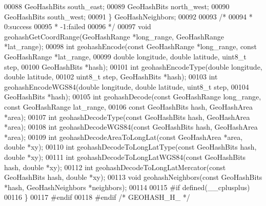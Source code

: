 \begin{DoxyCode}
00088     GeoHashBits south\_east;
00089     GeoHashBits north\_west;
00090     GeoHashBits south\_west;
00091 \} GeoHashNeighbors;
00092 
00093 \textcolor{comment}{/*}
00094 \textcolor{comment}{ * 0:success}
00095 \textcolor{comment}{ * -1:failed}
00096 \textcolor{comment}{ */}
00097 \textcolor{keywordtype}{void} geohashGetCoordRange(GeoHashRange *long\_range, GeoHashRange *lat\_range);
00098 \textcolor{keywordtype}{int} geohashEncode(\textcolor{keyword}{const} GeoHashRange *long\_range, \textcolor{keyword}{const} GeoHashRange *lat\_range,
00099                   \textcolor{keywordtype}{double} longitude, \textcolor{keywordtype}{double} latitude, uint8\_t step,
00100                   GeoHashBits *hash);
00101 \textcolor{keywordtype}{int} geohashEncodeType(\textcolor{keywordtype}{double} longitude, \textcolor{keywordtype}{double} latitude,
00102                       uint8\_t step, GeoHashBits *hash);
00103 \textcolor{keywordtype}{int} geohashEncodeWGS84(\textcolor{keywordtype}{double} longitude, \textcolor{keywordtype}{double} latitude, uint8\_t step,
00104                        GeoHashBits *hash);
00105 \textcolor{keywordtype}{int} geohashDecode(\textcolor{keyword}{const} GeoHashRange long\_range, \textcolor{keyword}{const} GeoHashRange lat\_range,
00106                   \textcolor{keyword}{const} GeoHashBits hash, GeoHashArea *area);
00107 \textcolor{keywordtype}{int} geohashDecodeType(\textcolor{keyword}{const} GeoHashBits hash, GeoHashArea *area);
00108 \textcolor{keywordtype}{int} geohashDecodeWGS84(\textcolor{keyword}{const} GeoHashBits hash, GeoHashArea *area);
00109 \textcolor{keywordtype}{int} geohashDecodeAreaToLongLat(\textcolor{keyword}{const} GeoHashArea *area, \textcolor{keywordtype}{double} *xy);
00110 \textcolor{keywordtype}{int} geohashDecodeToLongLatType(\textcolor{keyword}{const} GeoHashBits hash, \textcolor{keywordtype}{double} *xy);
00111 \textcolor{keywordtype}{int} geohashDecodeToLongLatWGS84(\textcolor{keyword}{const} GeoHashBits hash, \textcolor{keywordtype}{double} *xy);
00112 \textcolor{keywordtype}{int} geohashDecodeToLongLatMercator(\textcolor{keyword}{const} GeoHashBits hash, \textcolor{keywordtype}{double} *xy);
00113 \textcolor{keywordtype}{void} geohashNeighbors(\textcolor{keyword}{const} GeoHashBits *hash, GeoHashNeighbors *neighbors);
00114 
00115 \textcolor{preprocessor}{#}\textcolor{preprocessor}{if} \textcolor{preprocessor}{defined}\textcolor{preprocessor}{(}\_\_cplusplus\textcolor{preprocessor}{)}
00116 \}
00117 \textcolor{preprocessor}{#}\textcolor{preprocessor}{endif}
00118 \textcolor{preprocessor}{#}\textcolor{preprocessor}{endif} \textcolor{comment}{/* GEOHASH\_H\_ */}
\end{DoxyCode}
